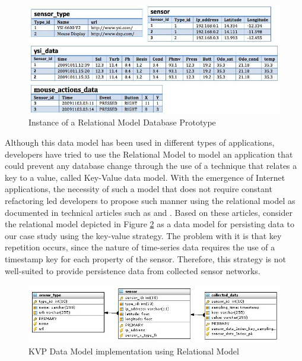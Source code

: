 \begin{figure}[!h]
  \centering
  \includegraphics[scale=0.7]{../diagrams/persistence-example-relational}
  \caption{Instance of a Relational Model Database Prototype}
  \label{fig:persistence-example-relational}
\end{figure}

Although this data model has been used in different types of applications,
developers have tried to use the Relational Model to model an application that
could prevent any database change through the use of a technique that relates a
key to a value, called Key-Value data model. With the emergence of Internet
applications, the necessity of such a model that does not require constant
refactoring led developers to propose such manner using the relational model as
documented in technical articles such as \cite{db-kvp-in-relational01} and
\cite{db-kvp-in-relational02}. Based on these articles, consider the
relational model depicted in Figure \ref{fig:KVP-on-Relational-Model} as a
data model for persisting data to our case study using the key-value strategy.
The problem with it is that key repetition occurs, since the nature of
time-series data requires the use of a timestamp key for each property of the
sensor. Therefore, this strategy is not well-suited to provide persistence
data from collected sensor networks.

\begin{figure}[!h]
  \centering
  \includegraphics[scale=0.6]{../diagrams/KVP-on-Relational-Model}
  \caption{KVP Data Model implementation using Relational Model}
  \label{fig:KVP-on-Relational-Model}
\end{figure}

